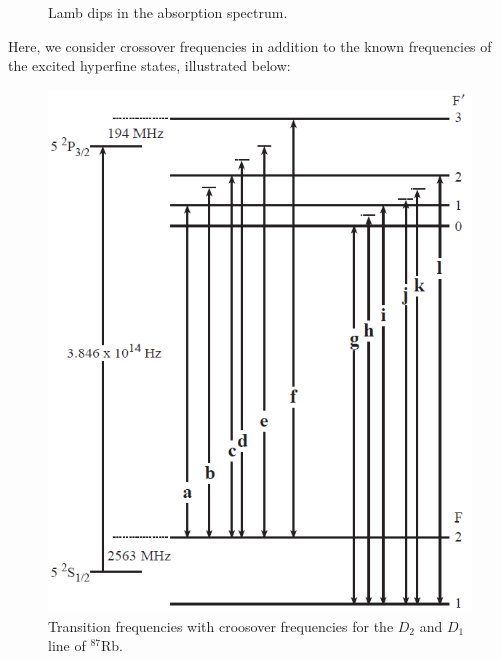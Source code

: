 \documentclass{article}
\begin{document}
\begin{figure}[h]
    \centering
    \begin{subfigure}{0.45\textwidth}
        \centering
        \scalebox{0.35}{}
        \caption{}
        \label{fig:lamb_dip_1}
    \end{subfigure}
    \begin{subfigure}{0.45\textwidth}
        \centering
        \scalebox{0.35}{}
        \caption{}
        \label{fig:lamb_dip_2}
    \end{subfigure}
    \begin{subfigure}{0.45\textwidth}
        \centering
        \scalebox{0.35}{}
        \caption{}
        \label{fig:lamb_dip_3}
    \end{subfigure}
    \begin{subfigure}{0.45\textwidth}
        \centering
        \scalebox{0.35}{}
        \caption{}
        \label{fig:lamb_dip_4}
    \end{subfigure}
    \caption{Lamb dips in the absorption spectrum.}
    \label{fig:lamb_dips}
\end{figure}

Here, we consider crossover frequencies in addition to the known frequencies of the excited hyperfine states, illustrated below:

\begin{figure}[h]
    \centering
    \includegraphics{Figures/4/Crossover.png}
    \caption{Transition frequencies with croosover frequencies for the $D_2$ and $D_1$ line of $^{87}$Rb. \cite{nakayama_1984_theoretical}}
    \label{fig:crossover_frequencies}
\end{figure}
\end{document}
